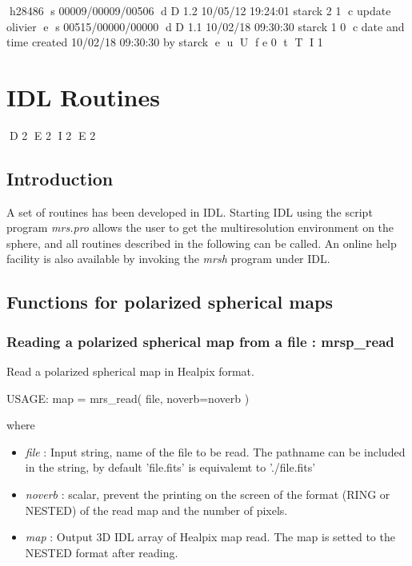 h28486
s 00009/00009/00506
d D 1.2 10/05/12 19:24:01 starck 2 1
c update olivier
e
s 00515/00000/00000
d D 1.1 10/02/18 09:30:30 starck 1 0
c date and time created 10/02/18 09:30:30 by starck
e
u
U
f e 0
t
T
I 1

\chapter{IDL Routines}
D 2
\label{ch_mrs_idl}
E 2
I 2
\label{ch_mrsp_idl}
E 2


\section{Introduction}
A set of routines has been developed in IDL. Starting IDL using the script program {\em mrs.pro} allows the user 
to get the multiresolution environment on the sphere, and all routines described in the following can be called. 
An online help facility is also available by invoking the {\em mrsh} program under IDL.
  

\section{Functions for polarized spherical maps}

\subsection{Reading a polarized spherical map from a file : mrsp\_read}
Read a polarized spherical map in Healpix format.
{\bf
\begin{center}
     USAGE: map = mrs\_read( file, noverb=noverb )
\end{center}}
where
\begin{itemize}
\item {\em file} : Input string, name of the file to be read. The pathname can be included in the string, by default 'file.fits' is equivalemt to './file.fits'
\item {\em noverb} : scalar, prevent the printing on the screen of the format (RING or NESTED) of the read map and the number of pixels.
\item {\em map} : Output 3D IDL array of Healpix map read. The map is setted to the NESTED format after reading.
\end{itemize}

